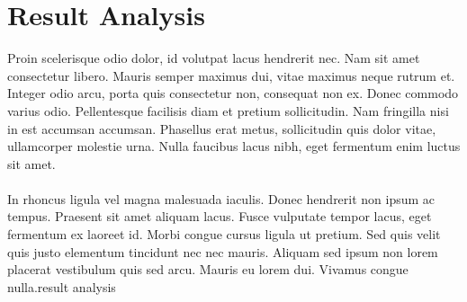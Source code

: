 \documentclass[journal]{IEEEtran}
\begin{document}
\section{Result Analysis}
Proin scelerisque odio dolor, id volutpat lacus hendrerit nec. Nam sit amet consectetur libero. Mauris semper maximus dui, vitae maximus neque rutrum et. Integer odio arcu, porta quis consectetur non, consequat non ex. Donec commodo varius odio. Pellentesque facilisis diam et pretium sollicitudin. Nam fringilla nisi in est accumsan accumsan. Phasellus erat metus, sollicitudin quis dolor vitae, ullamcorper molestie urna. Nulla faucibus lacus nibh, eget fermentum enim luctus sit amet.\\\\In rhoncus ligula vel magna malesuada iaculis. Donec hendrerit non ipsum ac tempus. Praesent sit amet aliquam lacus. Fusce vulputate tempor lacus, eget fermentum ex laoreet id. Morbi congue cursus ligula ut pretium. Sed quis velit quis justo elementum tincidunt nec nec mauris. Aliquam sed ipsum non lorem placerat vestibulum quis sed arcu. Mauris eu lorem dui. Vivamus congue nulla.result analysis
\ifCLASSOPTIONcaptionsoff
  \newpage
\fi


\vfill
\end{document}
